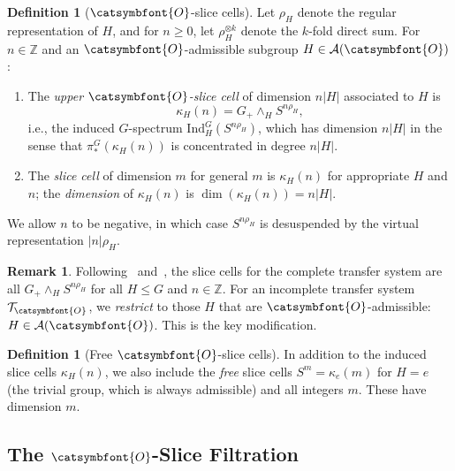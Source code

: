 \documentclass[12pt]{article}
\newcommand{\aO}{{\catsymbfont{O}}}
\newcommand{\aT}{{\mathcal{T}}}
\newcommand{\bZ}{\mathbb{Z}}
\theoremstyle{definition}
\newtheorem{definition}[theorem]{Definition}
\newtheorem{remark}[theorem]{Remark}
\begin{document}
\begin{definition}[$\aO$-slice cells]\label{def:slice-cells}
Let $\rho_H$ denote the regular representation of $H$, and for $n\geq 0$, let $\rho_H^{\otimes k}$ denote the $k$-fold direct sum.  For $n\in\bZ$ and an $\aO$-admissible subgroup $H\in\mathcal{A}(\aO)$:
\begin{enumerate}[label=(\alph*)]
\item The \emph{upper $\aO$-slice cell} of dimension $n|H|$ associated to $H$ is
   \[
      \kappa_H(n) = G_+ \wedge_H S^{n\rho_H},
   \]
   i.e., the induced $G$-spectrum $\mathrm{Ind}_H^G(S^{n\rho_H})$, which has dimension $n|H|$ in the sense that $\pi_*^G(\kappa_H(n))$ is concentrated in degree $n|H|$.
\item The \emph{slice cell} of dimension $m$ for general $m$ is $\kappa_H(n)$ for appropriate $H$ and $n$; the \emph{dimension} of $\kappa_H(n)$ is $\dim(\kappa_H(n)) = n|H|$.
\end{enumerate}
We allow $n$ to be negative, in which case $S^{n\rho_H}$ is desuspended by the virtual representation $|n|\rho_H$.
\end{definition}

\begin{remark}
Following~\cite[Def.~4.1]{HHR} and~\cite[Def.~5.1]{BlumbergHill}, the slice cells for the complete transfer system are all $G_+\wedge_H S^{n\rho_H}$ for all $H\leq G$ and $n\in\bZ$.  For an incomplete transfer system $\aT_\aO$, we \emph{restrict} to those $H$ that are $\aO$-admissible: $H\in\mathcal{A}(\aO)$.  This is the key modification.
\end{remark}

\begin{definition}[Free $\aO$-slice cells]\label{def:free-slice-cells}
In addition to the induced slice cells $\kappa_H(n)$, we also include the \emph{free} slice cells $S^m = \kappa_e(m)$ for $H = e$ (the trivial group, which is always admissible) and all integers $m$.  These have dimension $m$.
\end{definition}

\subsection{The $\aO$-Slice Filtration}
\end{document}
